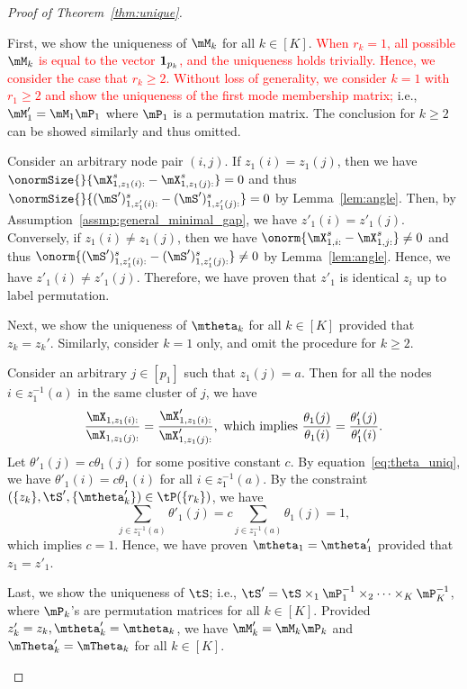 \documentclass[lettersize,onecolumn,journal]{IEEEtran}
\theoremstyle{definition}
\theoremstyle{definition}
\begin{document}
\begin{proof}[Proof of Theorem~\ref{thm:unique}]
\begin{enumerate}[wide]
First, we show the uniqueness of $\mM_k$ for all $k \in [K]$. \textcolor{red}{When $r_k = 1$, all possible $\mM_k$ is equal to the vector ${\bf 1}_{p_k}$, and the uniqueness holds trivially. Hence, we consider the case that $r_k \geq 2$. Without loss of generality, we consider $k=1$ with $r_1 \geq 2$ and show the uniqueness of the first mode membership matrix;}  i.e., $\mM'_1 = \mM_1\mP_1$ where $\mP_1$ is a permutation matrix. The conclusion for $k\geq 2$ can be showed similarly and thus omitted. 

Consider an arbitrary node pair $(i,j)$. If $z_1(i) = z_1(j)$, then we have $\onormSize{}{\mX_{1, z_1(i):}^s - \mX_{1, z_1(j):}^s } = 0$ and thus $\onormSize{}{ (\mS')_{1, z'_1(i):}^{s} - (\mS')_{1, z'_1(j):}^{s} } = 0$ by Lemma~\ref{lem:angle}. Then, by Assumption~\eqref{assmp:general_minimal_gap}, we have $z'_1(i) = z'_1(j)$. Conversely, if $z_1(i) \neq z_1(j)$, then we have $ \onorm{\mX_{1,i:}^s - \mX_{1,j:}^s} \neq 0$ and thus $\onorm{ (\mS')_{1, z'_1(i):}^{s} - (\mS')_{1, z'_1(j):}^{s} } \neq 0$ by Lemma~\ref{lem:angle}. Hence, we have $z'_1(i) \neq z'_1(j)$. Therefore, we have proven that $z'_1$ is identical $z_i$ up to label permutation.

Next, we show the uniqueness of $\mtheta_k$ for all $k \in [K]$ provided that $z_k = z_k'$. Similarly, consider $k=1$ only, and omit the procedure for $k\geq 2$. 

Consider an arbitrary $j \in [p_1]$ such that $z_1(j) = a$. Then for all the nodes $i \in  z_1^{-1}(a)$ in the same cluster of $j$, we have 
\begin{equation}
    \frac{\mX_{1,z_1(i):}}{\mX_{1,z_1(j):}} = \frac{\mX'_{1,z_1(i):}}{\mX'_{1,z_1(j):}}, \text{ which implies }  \frac{\theta_1(j)}{\theta_1(i)} = \frac{\theta'_1(j)}{\theta'_1(i)}.\label{eq:theta_uniq}
\end{equation}
Let $\theta'_1(j) = c\theta_1(j)$ for some positive constant $c$. By equation~\eqref{eq:theta_uniq}, we have $\theta'_1(i) = c \theta_1(i)$ for all $ i \in  z_1^{-1}(a)$. By the constraint $(\{z_k\}, \tS', \{\mtheta'_k\}) \in \tP(\{r_k\})$, we have 
\begin{equation}
    \sum_{j \in z_1^{-1}(a)} \theta'_1(j) = c \sum_{j \in z_1^{-1}(a)} \theta_1(j) = 1,
\end{equation}
which implies $c = 1$. Hence, we have proven $\mtheta_1 = \mtheta'_1$ provided that $z_1 = z'_1$.

Last, we show the uniqueness of $\tS$; i.e., $\tS'=\tS\times_1 \mP^{-1}_1\times_2\cdots \times_K \mP^{-1}_K$, where $\mP_k$'s are permutation matrices for all $k\in[K]$.  Provided $z'_k = z_k, \mtheta'_k = \mtheta_k$, we have $\mM'_k = \mM_k \mP_k$ and $\mTheta'_k = \mTheta_k$ for all $k \in [K]$. 


\end{enumerate}
\end{proof}
\end{document}
